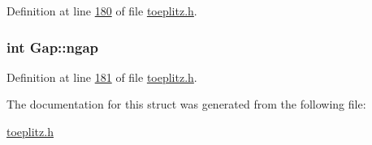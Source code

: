 Definition at line \hyperlink{toeplitz_8h_source_l00180}{180} of file \hyperlink{toeplitz_8h_source}{toeplitz.\-h}.

\hypertarget{structGap_a210dec7193ddb9dfdd57e60ab83f2ee0}{
\subsubsection[{ngap}]{\setlength{\rightskip}{0pt plus 5cm}int Gap\-::ngap}}\label{structGap_a210dec7193ddb9dfdd57e60ab83f2ee0}


Definition at line \hyperlink{toeplitz_8h_source_l00181}{181} of file \hyperlink{toeplitz_8h_source}{toeplitz.\-h}.



The documentation for this struct was generated from the following file\-:\begin{DoxyCompactItemize}
\item 
\hyperlink{toeplitz_8h}{toeplitz.\-h}\end{DoxyCompactItemize}
